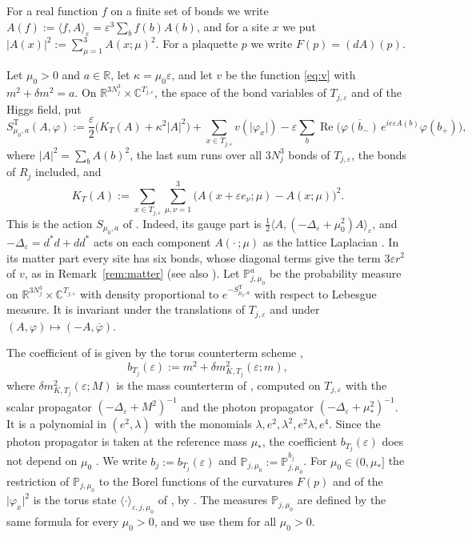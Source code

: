 \documentclass[11pt]{amsart}
\theoremstyle{plain}
\theoremstyle{definition}
\theoremstyle{remark}
\numberwithin{equation}{section}
\newcommand{\R}{\mathbb{R}}
\newcommand{\C}{\mathbb{C}}
\newcommand{\eps}{\varepsilon}
\newcommand{\abs}[1]{\lvert #1\rvert}
\newcommand{\ip}[2]{\langle #1,#2\rangle}
\newcommand{\ev}[1]{\langle #1\rangle}
\DeclareMathOperator{\re}{Re}
\begin{document}
For a real function $f$ on a finite set of bonds we write $A(f):=\ip fA_\eps=\eps^3\sum_bf(b)A(b)$, and for a site $x$ we put $\abs{A(x)}^2:=\sum_{\mu=1}^3A(x;\mu)^2$. For a plaquette $p$ we write $F(p)=(dA)(p)$.

Let $\mu_0>0$ and $a\in\R$, let $\kappa=\mu_0\eps$, and let $v$ be the function \eqref{eq:v} with $m^2+\delta m^2=a$. On $\R^{3N_j^3}\times\C^{T_{j,\eps}}$, the space of the bond variables of $T_{j,\eps}$ and of the Higgs field, put
\[
S^{\mathrm T}_{\mu_0,a}(A,\varphi):=\frac\eps2\big(K_T(A)+\kappa^2\abs A^2\big)+\sum_{x\in T_{j,\eps}}v(\abs{\varphi_x})-\eps\sum_b\re\big(\overline{\varphi(b_-)}\,e^{ie\eps A(b)}\varphi(b_+)\big),
\]
where $\abs A^2=\sum_bA(b)^2$, the last sum runs over all $3N_j^3$ bonds of $T_{j,\eps}$, the bonds of $R_j$ included, and
\[
K_T(A):=\sum_{x\in T_{j,\eps}}\sum_{\mu,\nu=1}^3\big(A(x+\eps e_\nu;\mu)-A(x;\mu)\big)^2 .
\]
This is the action $S_{\mu_0,a}$ of \cite[(2.1)--(2.2)]{v1}. Indeed, its gauge part is $\frac12\ip A{(-\Delta_\eps+\mu_0^2)A}_\eps$, and $-\Delta_\eps=d^*d+dd^*$ acts on each component $A(\cdot\,;\mu)$ as the lattice Laplacian \cite[Lemma~7.2]{v1}. In its matter part every site has six bonds, whose diagonal terms give the term $3\eps r^2$ of $v$, as in Remark~\ref{rem:matter} (see also \cite[Prop.~B.13]{v1}). Let $\mathbb P^a_{j,\mu_0}$ be the probability measure on $\R^{3N_j^3}\times\C^{T_{j,\eps}}$ with density proportional to $e^{-S^{\mathrm T}_{\mu_0,a}}$ with respect to Lebesgue measure. It is invariant under the translations of $T_{j,\eps}$ and under $(A,\varphi)\mapsto(-A,\overline\varphi)$.

The coefficient of \cite{v1} is given by the torus counterterm scheme \cite[Def.~2.2]{v1},
\[
b_{T_j}(\eps):=m^2+\delta m^2_{K,T_j}(\eps;m),
\]
where $\delta m^2_{K,T_j}(\eps;M)$ is the mass counterterm of \cite[(3.32)--(3.33), p.~659]{K1}, computed on $T_{j,\eps}$ with the scalar propagator $(-\Delta_\eps+M^2)^{-1}$ and the photon propagator $(-\Delta_\eps+\mu_*^2)^{-1}$. It is a polynomial in $(e^2,\lambda)$ with the monomials $\lambda,e^2,\lambda^2,e^2\lambda,e^4$. Since the photon propagator is taken at the reference mass $\mu_*$, the coefficient $b_{T_j}(\eps)$ does not depend on $\mu_0$ \cite[Def.~2.2 and Rem.~2.3(ii)]{v1}. We write $b_j:=b_{T_j}(\eps)$ and $\mathbb P_{j,\mu_0}:=\mathbb P^{b_j}_{j,\mu_0}$. For $\mu_0\in(0,\mu_*]$ the restriction of $\mathbb P_{j,\mu_0}$ to the Borel functions of the curvatures $F(p)$ and of the $\abs{\varphi_x}^2$ is the torus state $\ev\cdot_{\eps,j,\mu_0}$ of \cite[Def.~2.7]{v1}, by \cite[Lemma~B.7]{v1}. The measures $\mathbb P_{j,\mu_0}$ are defined by the same formula for every $\mu_0>0$, and we use them for all $\mu_0>0$.
\end{document}
